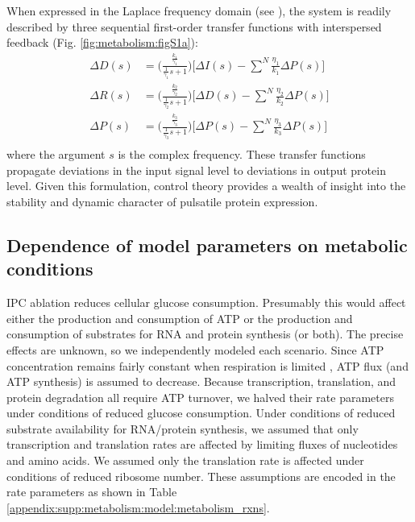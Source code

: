 When expressed in the Laplace frequency domain (see \cite{Seborg2000}), the system is readily described by three sequential first-order transfer functions with interspersed feedback (Fig. \ref{fig:metabolism:figS1a}):
\begin{equation}
\begin{aligned}
\Delta D(s) &= \Big( \frac{\frac{k_1}{\gamma_1}}{\frac{1}{\gamma_1}s+1} \Big) \Big [\Delta I(s) - \sum\limits_{}^{N} \frac{\eta_{1}}{k_1}\Delta P(s) \Big ] \\
\Delta R(s) &= \Big( \frac{\frac{k_2}{\gamma_2}}{\frac{1}{\gamma_2}s+1} \Big) \Big [\Delta D(s) - \sum\limits_{}^{N} \frac{\eta_{2}}{k_2}\Delta P(s) \Big ] \\
\Delta P(s) &= \Big( \frac{\frac{k_3}{\gamma_3}}{\frac{1}{\gamma_3}s+1} \Big) \Big [\Delta P(s) - \sum\limits_{}^{N} \frac{\eta_{3}}{k_3}\Delta P(s) \Big ] \\
\end{aligned}
\end{equation}
where the argument $s$ is the complex frequency. These transfer functions propagate deviations in the input signal level to deviations in output protein level. Given this formulation, control theory provides a wealth of insight into the stability and dynamic character of pulsatile protein expression.

\subsection{Dependence of model parameters on metabolic conditions}
\label{appendix:supp:metabolism:model:metabolism}

IPC ablation reduces cellular glucose consumption. Presumably this would affect either the production and consumption of ATP or the production and consumption of substrates for RNA and protein synthesis (or both). The precise effects are unknown, so we independently modeled each scenario. Since ATP concentration remains fairly constant when respiration is limited \cite{Brown1992}, ATP flux (and ATP synthesis) is assumed to decrease. Because transcription, translation, and protein degradation all require ATP turnover, we halved their rate parameters under conditions of reduced glucose consumption. Under conditions of reduced substrate availability for RNA/protein synthesis, we assumed that only transcription and translation rates are affected by limiting fluxes of nucleotides and amino acids. We assumed only the translation rate is affected under conditions of reduced ribosome number. These assumptions are encoded in the rate parameters as shown in Table \ref{appendix:supp:metabolism:model:metabolism_rxns}.


